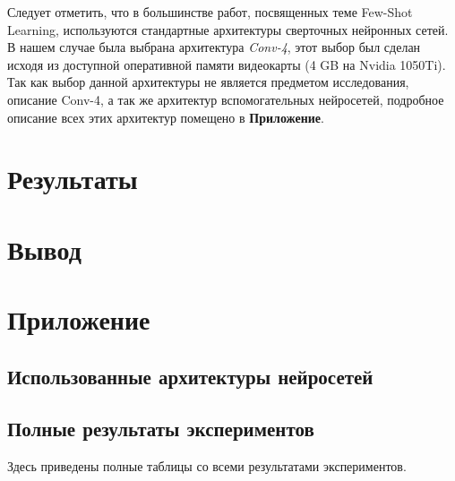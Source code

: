 \documentclass[a4paper, 12pt]{report}
\begin{document}
Следует отметить, что в большинстве работ, посвященных теме Few-Shot Learning, используются стандартные архитектуры сверточных нейронных сетей. В нашем случае была выбрана архитектура \textit{Conv-4}, этот выбор был сделан исходя из доступной оперативной памяти видеокарты (4 GB на Nvidia 1050Ti). Так как выбор данной архитектуры не является предметом исследования, описание Conv-4, а так же архитектур вспомогательных нейросетей, подробное описание всех этих архитектур помещено в \textbf{Приложение}.

\chapter{Результаты}

\chapter{Вывод}

\chapter{Приложение}

\section {Использованные архитектуры нейросетей}

\section {Полные результаты экспериментов}

Здесь приведены полные таблицы со всеми результатами экспериментов.
\end{document}
